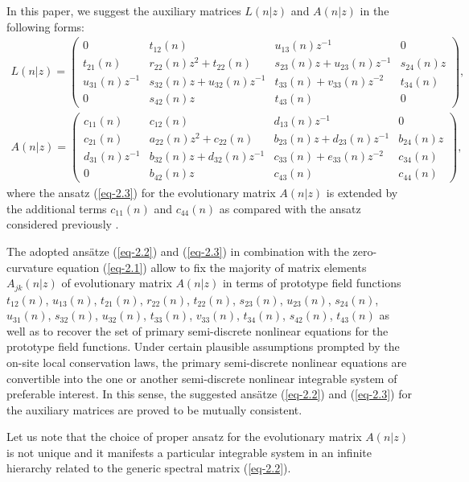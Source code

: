 \documentclass[10pt,a4paper]{amsart}
\numberwithin{equation}{section}
\begin{document}
In this paper, we suggest the auxiliary matrices $L(n|z)$ and $A(n|z)$ in the following forms:
\begin{gather}\label{eq-2.2}
	L(n|z) = \begin{pmatrix}
		0 & t_{12}(n) & u_{13}(n)z^{-1} & 0 \\
		t_{21}(n) & r_{22}(n)z^{2} + t_{22}(n) & s_{23}(n)z + u_{23}(n)z^{-1} & s_{24}(n)z \\
		u_{31}(n)z^{-1} & s_{32}(n)z + u_{32}(n)z^{-1} & t_{33}(n) + v_{33}(n)z^{-2} & t_{34}(n) \\
		0 & s_{42}(n)z & t_{43}(n) & 0	
	\end{pmatrix},
\\ \label{eq-2.3}
	A(n|z) = \begin{pmatrix}
		c_{11}(n) & c_{12}(n) & d_{13}(n)z^{-1} & 0 \\
		c_{21}(n) & a_{22}(n)z^{2} + c_{22}(n) & b_{23}(n)z + d_{23}(n)z^{-1} & b_{24}(n)z \\
		d_{31}(n)z^{-1} & b_{32}(n)z + d_{32}(n)z^{-1} & c_{33}(n) + e_{33}(n)z^{-2} & c_{34}(n) \\
		0 & b_{42}(n)z & c_{43}(n) & c_{44}(n)
	\end{pmatrix},
\end{gather}
where the ansatz (\ref{eq-2.3}) for the evolutionary matrix $A(n|z)$ is extended by the additional terms $c_{11}(n)$ and $c_{44}(n)$ as compared with the ansatz considered previously \cite{vakhnenko-JNMP-18-401, vakhnenko-JNMP-18-415}.

The adopted ans\"{a}tze (\ref{eq-2.2}) and (\ref{eq-2.3}) in combination with the zero-curvature equation (\ref{eq-2.1}) allow to fix the majority of matrix elements $A_{jk}(n|z)$ of evolutionary matrix $A(n|z)$ in terms of prototype field functions $t_{12}(n)$, $u_{13}(n)$, $t_{21}(n)$, $r_{22}(n)$, $t_{22}(n)$, $s_{23}(n)$, $u_{23}(n)$, $s_{24}(n)$, $u_{31}(n)$, $s_{32}(n)$, $u_{32}(n)$, $t_{33}(n)$, $v_{33}(n)$, $t_{34}(n)$, $s_{42}(n)$, $t_{43}(n)$ as well as to recover the set of primary semi-discrete nonlinear equations for the prototype field functions. Under certain plausible assumptions prompted by the on-site local conservation laws, the primary semi-discrete nonlinear equations are convertible into the one or another semi-discrete nonlinear integrable system of preferable interest. In this sense, the suggested ans\"{a}tze (\ref{eq-2.2}) and (\ref{eq-2.3}) for the auxiliary matrices are proved to be mutually consistent.

Let us note that the choice of proper ansatz for the evolutionary matrix $A(n|z)$ is not unique and it manifests a particular integrable system in an infinite hierarchy related to the generic spectral matrix (\ref{eq-2.2}).
\end{document}
